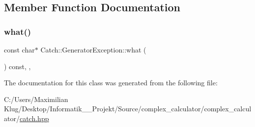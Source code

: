 \subsection{Member Function Documentation}
\mbox{\label{class_catch_1_1_generator_exception_ade029163144d136f12187e5b9a0161d5}} 
\subsubsection{\texorpdfstring{what()}{what()}}
{\footnotesize\ttfamily const char$\ast$ Catch\+::\+Generator\+Exception\+::what (\begin{DoxyParamCaption}{ }\end{DoxyParamCaption}) const\hspace{0.3cm}{\ttfamily [final]}, {\ttfamily [override]}, {\ttfamily [noexcept]}}



The documentation for this class was generated from the following file\+:\begin{DoxyCompactItemize}
\item 
C\+:/\+Users/\+Maximilian Klug/\+Desktop/\+Informatik\+\_\+\_\+\+Projekt/\+Source/complex\+\_\+calculator/complex\+\_\+calculator/\mbox{\hyperlink{catch_8hpp}{catch.\+hpp}}\end{DoxyCompactItemize}
